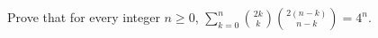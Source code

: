 Prove that for every integer $n\ge0$, $\displaystyle\sum_{k=0}^n\binom{2k}{k}\binom{2(n-k)}{n-k}=4^n$.

